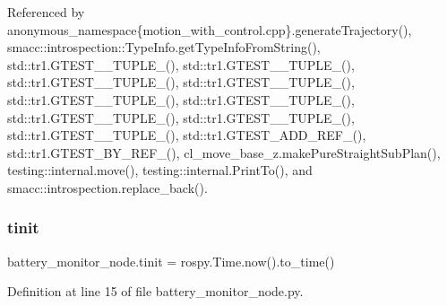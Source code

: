 Referenced by anonymous\+\_\+namespace\{motion\+\_\+with\+\_\+control.\+cpp\}.\+generate\+Trajectory(), smacc\+::introspection\+::\+Type\+Info.\+get\+Type\+Info\+From\+String(), std\+::tr1.\+G\+T\+E\+S\+T\+\_\+\_\+\+T\+U\+P\+L\+E\+\_\+(), std\+::tr1.\+G\+T\+E\+S\+T\+\_\+\_\+\+T\+U\+P\+L\+E\+\_\+(), std\+::tr1.\+G\+T\+E\+S\+T\+\_\+\_\+\+T\+U\+P\+L\+E\+\_\+(), std\+::tr1.\+G\+T\+E\+S\+T\+\_\+\_\+\+T\+U\+P\+L\+E\+\_\+(), std\+::tr1.\+G\+T\+E\+S\+T\+\_\+\_\+\+T\+U\+P\+L\+E\+\_\+(), std\+::tr1.\+G\+T\+E\+S\+T\+\_\+\_\+\+T\+U\+P\+L\+E\+\_\+(), std\+::tr1.\+G\+T\+E\+S\+T\+\_\+\_\+\+T\+U\+P\+L\+E\+\_\+(), std\+::tr1.\+G\+T\+E\+S\+T\+\_\+\_\+\+T\+U\+P\+L\+E\+\_\+(), std\+::tr1.\+G\+T\+E\+S\+T\+\_\+\_\+\+T\+U\+P\+L\+E\+\_\+(), std\+::tr1.\+G\+T\+E\+S\+T\+\_\+\+A\+D\+D\+\_\+\+R\+E\+F\+\_\+(), std\+::tr1.\+G\+T\+E\+S\+T\+\_\+\+B\+Y\+\_\+\+R\+E\+F\+\_\+(), cl\+\_\+move\+\_\+base\+\_\+z.\+make\+Pure\+Straight\+Sub\+Plan(), testing\+::internal.\+move(), testing\+::internal.\+Print\+To(), and smacc\+::introspection.\+replace\+\_\+back().

\mbox{\label{namespacebattery__monitor__node_adb6d4f12628aa05bce6384b0f89001e4}} 
\subsubsection{\texorpdfstring{tinit}{tinit}}
{\footnotesize\ttfamily battery\+\_\+monitor\+\_\+node.\+tinit = rospy.\+Time.\+now().to\+\_\+time()}



Definition at line 15 of file battery\+\_\+monitor\+\_\+node.\+py.

